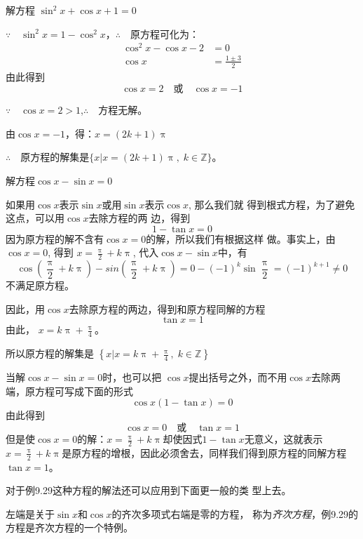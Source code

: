 \begin{example}
    解方程 $\sin^2 x+\cos x+1=0$
\end{example}

\begin{solution}
$\because\quad \sin^2 x=1-\cos^2x$，\qquad $\therefore\quad $原方程可化为：
\[\begin{split}
    \cos^2x-\cos x-2&=0\\
    \cos x&=\frac{1\pm 3}{2}
\end{split}\]
由此得到
\[\cos x=2\quad \text{或}\quad \cos x=-1\]

$\because\quad \cos x=2>1$,\qquad  $\therefore\quad $方程无解。

由$ \cos x=-1$，得：$x=(2k+1)\uppi$

$\therefore\quad $原方程的解集是$\{x|x=(2k+1)\uppi,\; k\in\mathbb{Z}\}$。
\end{solution}

\begin{example}
    解方程$\cos x-\sin x=0$
\end{example}

\begin{solution}
    如果用$\cos x$表示$\sin x$或用$\sin x$表示$\cos x$, 那么我们就
    得到根式方程，为了避免这点，可以用$\cos x$去除方程的两
    边，得到
    \[1-\tan x=0\]
    因为原方程的解不含有$\cos x=0$的解，所以我们有根据这样
    做。事实上，由$\cos x=0$, 得到
    $x=\frac{\uppi}{2}+k\uppi$, 代入$\cos x-\sin x$中，有
   \[ \cos\left(\frac{\uppi}{2}+k\uppi \right)-sin\left(\frac{\uppi}{2}+k\uppi \right)=0-(-1)^k\sin \frac{\uppi}{2}=(-1)^{k+1}\ne 0\]
    不满足原方程。
    
    因此，用$\cos x$去除原方程的两边，得到和原方程同解的方程
    \[\tan x=1\]
    由此，
   $ x=k\uppi +\frac{\uppi}{4}$。

   所以原方程的解集是
$\left\{x\Big|x=k\uppi+\frac{\uppi}{4},\; k\in\mathbb{Z}\right\}$
\end{solution}

\begin{rmk}
当解$\cos x-\sin x=0$时，也可以把
$\cos x$提出括号之外，而不用$\cos x$去除两端，原方程可写成下面的形式
$$\cos x (1-\tan x)=0$$
由此得到
$$\cos x=0\quad \text{或}\quad \tan x=1$$
但是使$\cos x=0$的解：$x=\frac{\uppi}{2}+k\uppi$却使因式$1-\tan x$无意义，这就表示$x=\frac{\uppi}{2}+k\uppi$是原方程的增根，因此必须舍去，同样我们得到原方程的同解方程
$\tan x=1$。

对于例9.29这种方程的解法还可以应用到下面更一般的类
型上去。

左端是关于$\sin x$和$\cos x$的齐次多项式右端是零的方程，
称为\emph{齐次方程}，例9.29的方程是齐次方程的一个特例。
\end{rmk}




